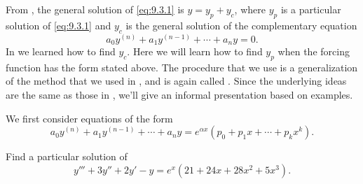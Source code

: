 From , the general solution of \eqref{eq:9.3.1} is
$y=y_p+y_c$, where $y_p$ is a particular
solution
of \eqref{eq:9.3.1} and
$y_c$ is the general solution of the complementary equation
\[
a_0y^{(n)}+a_1y^{(n-1)}+\cdots+a_ny=0.
\]
In  we learned how to find $y_c$. Here
we
will learn how to find $y_p$ when the forcing function has the form stated
above. The procedure that we  use is a generalization of the
method that we used in
,
and is again called
. Since
the underlying ideas are the same as those in
,
we'll give  an informal presentation based on
examples.



We  first consider  equations of the form
\[
a_0y^{(n)}+a_1y^{(n-1)}+\cdots+a_ny=e^{\alpha
x}\left(p_0+p_1x+\cdots+p_kx^k\right).
\]

\begin{example}\label{example:9.3.1}
Find a particular solution of
\begin{equation} \label{eq:9.3.2}
y'''+3y''+2y'-y=e^x(21+24x+28x^2+5x^3).
\end{equation}
\end{example}

